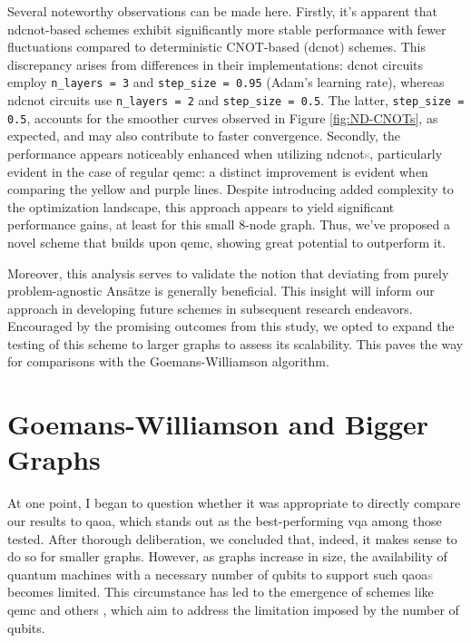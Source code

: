 Several noteworthy observations can be made here. Firstly, it's apparent that \acrshort{ndcnot}-based schemes exhibit significantly more stable performance with fewer fluctuations compared to deterministic CNOT-based (\acrshort{dcnot}) schemes. This discrepancy arises from differences in their implementations: \acrshort{dcnot} circuits employ \texttt{n\_layers = 3} and \texttt{step\_size = 0.95} (Adam's learning rate), whereas \acrshort{ndcnot} circuits use \texttt{n\_layers = 2} and \texttt{step\_size = 0.5}. The latter, \texttt{step\_size = 0.5}, accounts for the smoother curves observed in Figure \ref{fig:ND-CNOTs}, as expected, and may also contribute to faster convergence. Secondly, the performance appears noticeably enhanced when utilizing \acrshort{ndcnot}\textcolor{gray}{s}, particularly evident in the case of regular \acrshort{qemc}: a distinct improvement is evident when comparing the yellow and purple lines. Despite introducing added complexity to the optimization landscape, this approach appears to yield significant performance gains, at least for this small $8$-node graph. Thus, we've proposed a novel scheme that builds upon \acrshort{qemc}, showing great potential to outperform it.

Moreover, this analysis serves to validate the notion that deviating from purely problem-agnostic Ansätze is generally beneficial. This insight will inform our approach in developing future schemes in subsequent research endeavors. Encouraged by the promising outcomes from this study, we opted to expand the testing of this scheme to larger graphs to assess its scalability. This paves the way for comparisons with the Goemans-Williamson algorithm.





\vspace{-2.5mm}
\section{Goemans-Williamson and Bigger Graphs}
\label{section:GW_Bigger_Graphs}


At one point, I began to question whether it was appropriate to directly compare our results to \acrshort{qaoa}, which stands out as the best-performing \acrshort{vqa} among those tested. After thorough deliberation, we concluded that, indeed, it makes sense to do so for smaller graphs. However, as graphs increase in size, the availability of quantum machines with a necessary number of qubits to support such \acrshort{qaoa}\textcolor{gray}{s} becomes limited. This circumstance has led to the emergence of schemes like \acrshort{qemc} \cite{tenecohen2023variational} and others \cite{sciorilli2024largescale}, which aim to address the limitation imposed by the number of qubits.

